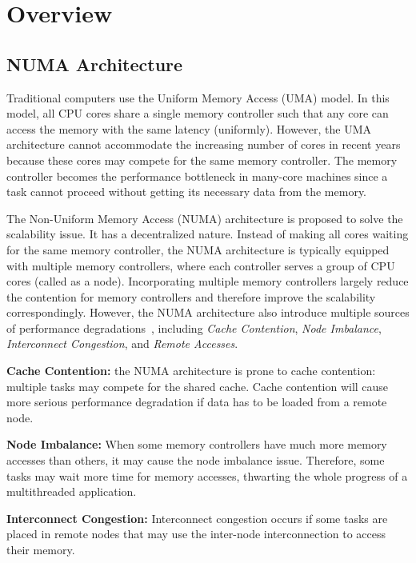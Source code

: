 \section{Overview}

\subsection{NUMA Architecture}
\label{sec:numa}

Traditional computers use the Uniform Memory Access (UMA) model. In this model,  all CPU cores share a single memory controller such that any core can access the memory with the same latency (uniformly). However, the UMA architecture cannot accommodate the increasing number of cores in recent years because these cores may compete for the same memory controller. The memory controller becomes the performance bottleneck in many-core machines since a task cannot proceed without getting its necessary data from the memory. 

The Non-Uniform Memory Access (NUMA) architecture is proposed to solve the scalability issue. It has a decentralized nature. Instead of making all cores waiting for the same memory controller, the NUMA architecture  is typically equipped with multiple memory controllers, where each controller serves a group of CPU cores (called as a node). Incorporating multiple memory controllers largely reduce the contention for memory controllers and therefore improve the scalability correspondingly. However, the NUMA architecture also introduce multiple sources of performance degradations~\cite{Blagodurov:2011:CNC:2002181.2002182}, including \textit{Cache Contention}, \textit{Node Imbalance}, \textit{Interconnect Congestion}, and \textit{Remote Accesses}. 

\textbf{Cache Contention:} the NUMA architecture is prone to cache contention: multiple tasks may compete for the shared cache. Cache contention will cause more serious performance degradation if data has to be loaded from a remote node. 
 
\textbf{Node Imbalance:} When some memory controllers have much more memory accesses than others, it may cause the node imbalance issue. Therefore, some tasks may wait more time for memory accesses, thwarting the whole progress of a multithreaded application.  

\textbf{Interconnect Congestion:} Interconnect congestion occurs if some tasks are placed in remote nodes that may use the inter-node interconnection to access their memory. 

